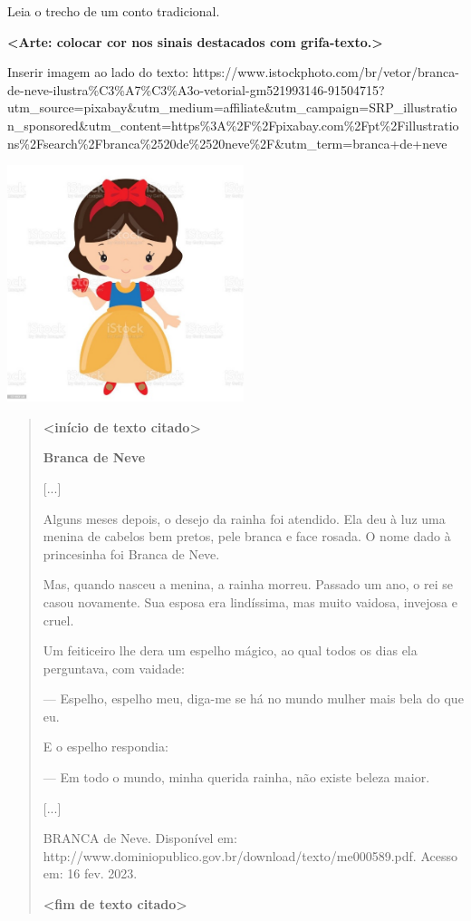 Leia o trecho de um conto tradicional.

\textbf{\textless{}Arte: colocar cor nos sinais destacados com
grifa-texto.\textgreater{}}

Inserir imagem ao lado do texto:
https://www.istockphoto.com/br/vetor/branca-de-neve-ilustra\%C3\%A7\%C3\%A3o-vetorial-gm521993146-91504715?utm\_source=pixabay\&utm\_medium=affiliate\&utm\_campaign=SRP\_illustration\_sponsored\&utm\_content=https\%3A\%2F\%2Fpixabay.com\%2Fpt\%2Fillustrations\%2Fsearch\%2Fbranca\%2520de\%2520neve\%2F\&utm\_term=branca+de+neve

\includegraphics[width=2.71875in,height=2.71875in]{media/image6.jpeg}

\begin{quote}
\textbf{\textless{}início de texto citado\textgreater{}}

\textbf{Branca de Neve}

{[}...{]}

Alguns meses depois, o desejo da rainha foi atendido. Ela deu à luz uma
menina de cabelos bem pretos, pele branca e face rosada. O nome dado à
princesinha foi Branca de Neve.

Mas, quando nasceu a menina, a rainha morreu. Passado um ano, o rei se
casou novamente. Sua esposa era lindíssima, mas muito vaidosa, invejosa
e cruel.

Um feiticeiro lhe dera um espelho mágico, ao qual todos os dias ela
perguntava, com vaidade:

--- Espelho, espelho meu, diga-me se há no mundo mulher mais bela do que
eu.

E o espelho respondia:

--- Em todo o mundo, minha querida rainha, não existe beleza maior.

{[}...{]}

BRANCA de Neve. Disponível em:
http://www.dominiopublico.gov.br/download/texto/me000589.pdf. Acesso em:
16 fev. 2023.

\textbf{\textless{}fim de texto citado\textgreater{}}
\end{quote}


